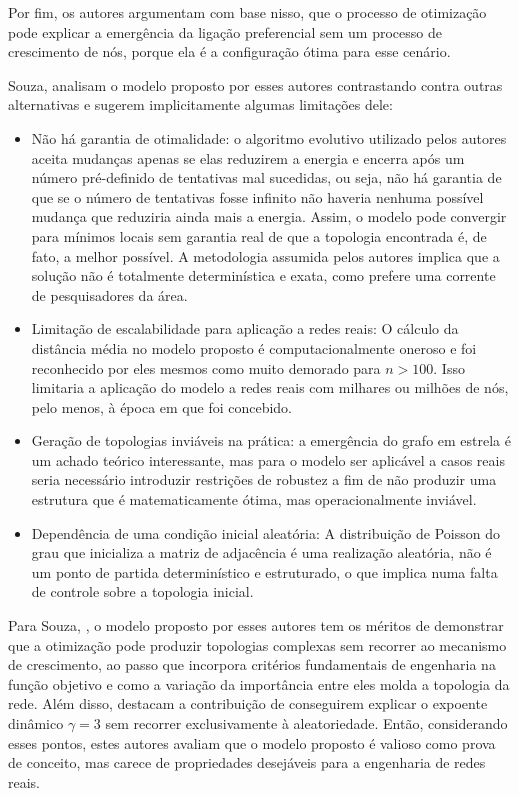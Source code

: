 \documentclass[12pt,oneside,a4paper,brazil,sumario=tradicional]{abntex2}
\begin{document}
Por fim, os autores argumentam com base nisso, que o processo de otimização pode explicar a emergência da ligação preferencial sem um processo de crescimento de nós, porque ela é a configuração ótima para esse cenário.

Souza, \textcite{souza2012} analisam o modelo proposto por esses autores contrastando contra outras alternativas e sugerem implicitamente algumas limitações dele:

\begin{itemize}
  \item Não há garantia de otimalidade: o algoritmo evolutivo utilizado pelos autores aceita mudanças apenas se elas reduzirem a energia e encerra após um número pré-definido de tentativas mal sucedidas, ou seja, não há garantia de que se o número de tentativas fosse infinito não haveria nenhuma possível mudança que reduziria ainda mais a energia. Assim, o modelo pode convergir para mínimos locais sem garantia real de que a topologia encontrada é, de fato, a melhor possível. A metodologia assumida pelos autores implica que a solução não é totalmente determinística e exata, como prefere uma corrente de pesquisadores da área.
  \item Limitação de escalabilidade para aplicação a redes reais: O cálculo da distância média no modelo proposto é computacionalmente oneroso e foi reconhecido por eles mesmos como muito demorado para $n > 100$. Isso limitaria a aplicação do modelo a redes reais com milhares ou milhões de nós, pelo menos, à época em que foi concebido.
  \item Geração de topologias inviáveis na prática: a emergência do grafo em estrela é um achado teórico interessante, mas para o modelo ser aplicável a casos reais seria necessário introduzir restrições de robustez a fim de não produzir uma estrutura que é matematicamente ótima, mas operacionalmente inviável.
  \item Dependência de uma condição inicial aleatória: A distribuição de Poisson do grau que inicializa a matriz de adjacência é uma realização aleatória, não é um ponto de partida determinístico e estruturado, o que implica numa falta de controle sobre a topologia inicial.
\end{itemize}

Para Souza, \textcite{souza2012}, o modelo proposto por esses autores tem os méritos de demonstrar que a otimização pode produzir topologias complexas sem recorrer ao mecanismo de crescimento, ao passo que incorpora critérios fundamentais de engenharia na função objetivo e como a variação da importância entre eles molda a topologia da rede. Além disso, destacam a contribuição de conseguirem explicar o expoente dinâmico $\gamma = 3$ sem recorrer exclusivamente à aleatoriedade. Então, considerando esses pontos, estes autores avaliam que o modelo proposto é valioso como prova de conceito, mas carece de propriedades desejáveis para a engenharia de redes reais.
\end{document}
